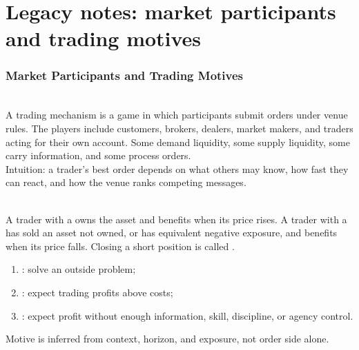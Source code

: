 \documentclass[a4paper,oneside,openany]{book}
\begin{document}
\chapter*{Legacy notes: market participants and trading motives}

\subsection*{Market Participants and Trading Motives}

\begin{model} \\
A trading mechanism is a game in which participants submit orders under venue rules. The players include customers, brokers, dealers, market makers, and traders acting for their own account. Some demand liquidity, some supply liquidity, some carry information, and some process orders.\\
Intuition: a trader's best order depends on what others may know, how fast they can react, and how the venue ranks competing messages.
\end{model}

\begin{notation} \\
A trader with a  owns the asset and benefits when its price rises. A trader with a  has sold an asset not owned, or has equivalent negative exposure, and benefits when its price falls. Closing a short position is called .
\end{notation}

\begin{taxonomy} 
\begin{enumerate}[label=\roman*.]
\setlength{\itemsep}{0pt}
\item {}: solve an outside problem;
\item {}: expect trading profits above costs;
\item {}: expect profit without enough information, skill, discipline, or agency control.
\end{enumerate}
Motive is inferred from context, horizon, and exposure, not order side alone.
\end{taxonomy}
\end{document}
